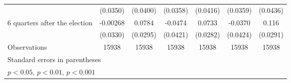 \begin{table}[htbp]
\begin{tabular}{l*{6}{c}}
                    &    (0.0350)         &    (0.0400)         &    (0.0358)         &    (0.0416)         &    (0.0359)         &    (0.0436)         \\
[1em]
 6 quarters after the election&    -0.00268         &      0.0784\sym{**} &     -0.0474         &      0.0733\sym{**} &     -0.0370         &       0.116\sym{***}\\
                    &    (0.0330)         &    (0.0295)         &    (0.0421)         &    (0.0282)         &    (0.0424)         &    (0.0291)         \\
\hline
Observations        &       15938         &       15938         &       15938         &       15938         &       15938         &       15938         \\
\hline\hline
\multicolumn{7}{l}{\footnotesize Standard errors in parentheses}\\
\multicolumn{7}{l}{\footnotesize \sym{*} \(p<0.05\), \sym{**} \(p<0.01\), \sym{***} \(p<0.001\)}\\
\end{tabular}
\end{table}

